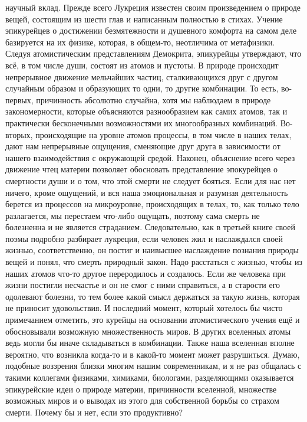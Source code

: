 научный вклад. Прежде всего Лукреция известен своим произведением о природе
вещей, состоящим из шести глав и написанным полностью в стихах. Учение
эпикурейцев о достижении безмятежности и душевного комфорта на самом деле
базируется на их физике, которая, в общем-то, неотличима от метафизики. Следуя
атомистическим представлениям Демокрита, эпикурейцы утверждают, что всё, в том
числе души, состоят из атомов и пустоты. В природе происходит непрерывное
движение мельчайших частиц, сталкивающихся друг с другом случайным образом и
образующих то одни, то другие комбинации. То есть, во-первых, причинность
абсолютно случайна, хотя мы наблюдаем в природе закономерности, которые
объясняются разнообразием как самих атомов, так и практически бесконечными
возможностями их многообразных комбинаций. Во-вторых, происходящие на уровне
атомов процессы, в том числе в наших телах, дают нам непрерывные ощущения,
сменяющие друг друга в зависимости от нашего взаимодействия с окружающей средой.
Наконец, объяснение всего через движение чтец материи позволяет обосновать
представление эпокурейцев о смертности души и о том, что этой смерти не следует
бояться. Если для нас нет ничего, кроме ощущений, и вся наша эмоциональная и
разумная деятельность берется из процессов на микроуровне, происходящих в телах,
то, как только тело разлагается, мы перестаем что-либо ощущать, поэтому сама
смерть не болезненна и не является страданием. Следовательно, как в третьей
книге своей поэмы подробно разбирает лукреция, если человек жил и наслаждался
своей жизнью, соответственно, он постиг и наивысшее наслаждение познания природы
вещей и понял, что смерть природный закон. Надо расстаться с жизнью, чтобы из
наших атомов что-то другое переродилось и создалось. Если же человека при жизни
постигли несчастье и он не смог с ними справиться, а в старости его одолевают
болезни, то тем более какой смысл держаться за такую жизнь, которая не приносит
удовольствия. И последний момент, который хотелось бы чисто примечанием
отметить, это курейцы на основании атомистического учения ещё и обосновывали
возможную множественность миров. В других вселенных атомы ведь могли бы иначе
складываться в комбинации. Также наша вселенная вполне вероятно, что возникла
когда-то и в какой-то момент может разрушиться. Думаю, подобные воззрения близки
многим нашим современникам, и я не раз общалась с такими коллегами физиками,
химиками, биологами, разделяющими оказывается эпикурейские идеи о природе
материи, причинности вселенной, множестве возможных миров и о выводах из этого
для собственной борьбы со страхом смерти. Почему бы и нет, если это продуктивно?
